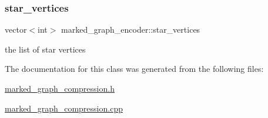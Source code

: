 \subsubsection{\texorpdfstring{star\+\_\+vertices}{star\_vertices}}
{\footnotesize\ttfamily vector$<$int$>$ marked\+\_\+graph\+\_\+encoder\+::star\+\_\+vertices\hspace{0.3cm}{\ttfamily [private]}}



the list of star vertices 



The documentation for this class was generated from the following files\+:\begin{DoxyCompactItemize}
\item 
\hyperlink{marked__graph__compression_8h}{marked\+\_\+graph\+\_\+compression.\+h}\item 
\hyperlink{marked__graph__compression_8cpp}{marked\+\_\+graph\+\_\+compression.\+cpp}\end{DoxyCompactItemize}
